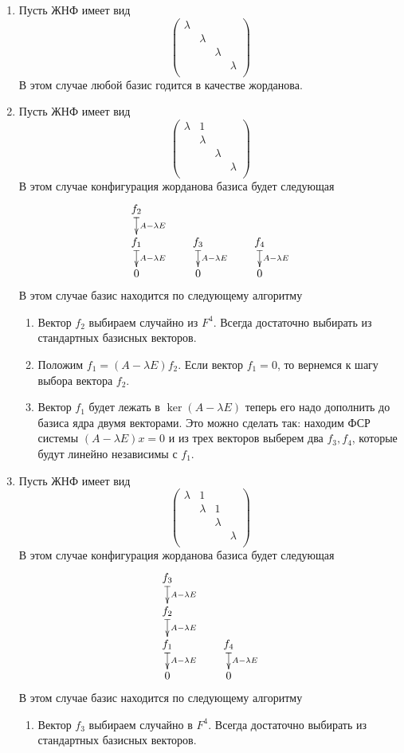 \documentclass{article}
\begin{document}
\begin{enumerate}
\item Пусть ЖНФ имеет вид
\[
\begin{pmatrix}
{\lambda}&{}&{}&{}\\
{}&{\lambda}&{}&{}\\
{}&{}&{\lambda}&{}\\
{}&{}&{}&{\lambda}\\
\end{pmatrix}
\]
В этом случае любой базис годится в качестве жорданова.

\item Пусть ЖНФ имеет вид
\[
\begin{pmatrix}
{\lambda}&{1}&{}&{}\\
{}&{\lambda}&{}&{}\\
{}&{}&{\lambda}&{}\\
{}&{}&{}&{\lambda}\\
\end{pmatrix}
\]
В этом случае конфигурация жорданова базиса будет следующая
\[
\xymatrix@R=15pt@C=40pt{
  {f_2}\ar@{|->}[d]^{A-\lambda E}&{}&{}\\
  {f_1}\ar@{|->}[d]^{A-\lambda E}&{f_3}\ar@{|->}[d]^{A-\lambda E}&{f_4}\ar@{|->}[d]^{A-\lambda E}\\
  {0}&{0}&{0}
}
\]
В этом случае базис находится по следующему алгоритму
\begin{enumerate}
\item Вектор $f_2$ выбираем случайно из $F^4$.
Всегда достаточно выбирать из стандартных базисных векторов.

\item Положим $f_1 = (A - \lambda E) f_2$.
Если вектор $f_1 = 0$, то вернемся к шагу выбора вектора $f_2$.

\item Вектор $f_1$ будет лежать в $\ker(A - \lambda E)$ теперь его надо дополнить до базиса ядра двумя векторами.
Это можно сделать так: находим ФСР системы $(A - \lambda E)x = 0$ и из трех векторов выберем два $f_3, f_4$, которые будут линейно независимы с $f_1$.
\end{enumerate}

\item Пусть ЖНФ имеет вид
\[
\begin{pmatrix}
{\lambda}&{1}&{}&{}\\
{}&{\lambda}&{1}&{}\\
{}&{}&{\lambda}&{}\\
{}&{}&{}&{\lambda}\\
\end{pmatrix}
\]
В этом случае конфигурация жорданова базиса будет следующая
\[
\xymatrix@R=15pt@C=40pt{
  {f_3}\ar@{|->}[d]^{A-\lambda E}&{}\\
  {f_2}\ar@{|->}[d]^{A-\lambda E}&{}\\
  {f_1}\ar@{|->}[d]^{A-\lambda E}&{f_4}\ar@{|->}[d]^{A-\lambda E}\\
  {0}&{0}
}
\]
В этом случае базис находится по следующему алгоритму
\begin{enumerate}
\item Вектор $f_3$ выбираем случайно в $F^4$.
Всегда достаточно выбирать из стандартных базисных векторов.


\end{enumerate}
\end{enumerate}
\end{document}
